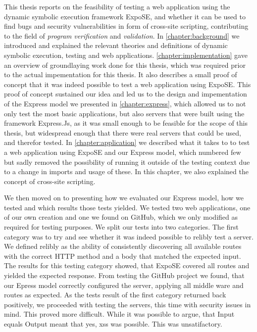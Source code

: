 This thesis reports on the feasibility of testing a web application using the dynamic symbolic execution framework ExpoSE, 
and whether it can be used to find bugs and security vulnerabilities in form of cross-site scripting, 
contributing to the field of \textit{program} \textit{verification} and \textit{validation}.
In \autoref{chapter:background} we introduced and explained the relevant theories and definitions of dynamic symbolic execution, testing and web applications.
\autoref{chapter:implementation} gave an overview of groundlaying work done for this thesis, which was required prior to the actual impementation for this thesis.
It also describes a small proof of concept that it was indeed possible to test a web application using ExpoSE. 
This proof of concept sustained our idea and led us to the design and impementation of the Express model we presented in \autoref{chapter:express}, which allowed us to not only test the most basic applications,
but also servers that were built using the framework Express.Js, as it was small enough to be feasible for the scope of this thesis, but widespread enough that 
there were real servers that could be used, and therefor tested. In \autoref{chapter:application} we described what it takes to to test a web application using ExpoSE and our Express model, 
which numbered few but sadly removed the possibility of running it outside of the testing context due to a change in imports and usage of these.
In this chapter, we also explained the concept of cross-site scripting.

We then moved on to presenting how we evaluated our Express model, how we tested and which results those tests yielded. We tested two web applications, one of our own creation and one we found on GitHub, which we 
only modified as required for testing purposes. We split our tests into two categories. The first category was to try and see whether it was indeed possible to relibly test a server. 
We defined relibly as the ability of consistently discovering all available routes with the correct HTTP method and a body that matched the expected input. The results for this testing category showed,
that ExpoSE covered all routes and yielded the expected response. From testing the GitHub project we found, that our Epress model correctly configured the server, applying all middle ware and routes as expected.
As the tests result of the first category returned back positively, we proceeded with testing the servers, this time with security issues in mind. This proved more difficult. While it was possible to argue, that 
Input equals Output meant that yes, xss was possible. This was unsatifactory. 



